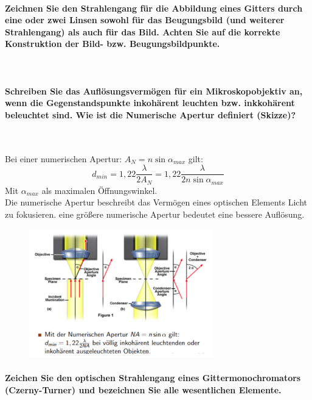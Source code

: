 \documentclass[a4paper, 11pt, ngerman, parskip=half]{scrartcl}
\begin{document}
\paragraph{Zeichnen Sie den Strahlengang für die Abbildung eines Gitters durch eine oder zwei Linsen
sowohl für das Beugungsbild (und weiterer Strahlengang) als auch für das Bild. Achten Sie
auf die korrekte Konstruktion der Bild- bzw. Beugungsbildpunkte.} ~

\paragraph{Schreiben Sie das Auflösungsvermögen für ein Mikroskopobjektiv an, wenn die
Gegenstandspunkte inkohärent leuchten bzw. inkkohärent beleuchtet sind. Wie ist die Numerische
Apertur definiert (Skizze)?} ~

Bei einer numerischen Apertur: $A_N = n \sin \alpha_{max}$ gilt:
\begin{equation}
    d_{min} = 1,22 \frac{\lambda}{2 A_N} = 1,22 \frac{\lambda}{2 n \sin \alpha_{max}}
\end{equation}
Mit $\alpha_{max}$ als maximalen Öffnungswinkel.\\
Die numerische Apertur beschreibt das Vermögen eines optischen Elements Licht zu fokusieren. eine größere numerische Apertur 
bedeutet eine bessere Auflösung.
\begin{figure}[H]
    \centering
    \includegraphics[width=8cm]{image/22/opt25}
\end{figure}

\paragraph{Zeichen Sie den optischen Strahlengang eines Gittermonochromators (Czerny-Turner) und
bezeichnen Sie alle wesentlichen Elemente.} ~
\end{document}
